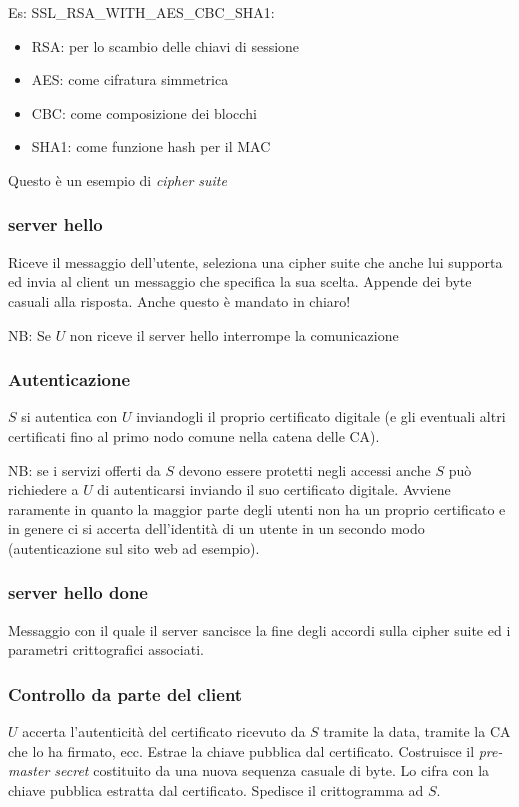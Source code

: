 Es: SSL\_RSA\_WITH\_AES\_CBC\_SHA1:
\begin{itemize}
    \item RSA: per lo scambio delle chiavi di sessione
    \item AES: come cifratura simmetrica
    \item CBC: come composizione dei blocchi
    \item SHA1: come funzione hash per il MAC
\end{itemize}
Questo è un esempio di \emph{cipher suite}

\subsubsection{server hello}
Riceve il messaggio dell'utente, seleziona una cipher suite che anche lui supporta ed invia al client un messaggio che specifica la sua scelta. Appende dei byte casuali alla risposta. Anche questo è mandato in chiaro!

NB: Se $U$ non riceve il server hello interrompe la comunicazione

\subsubsection{Autenticazione}
$S$ si autentica con $U$ inviandogli il proprio certificato digitale (e gli eventuali altri certificati fino al primo nodo comune nella catena delle CA).

NB: se i servizi offerti da $S$ devono essere protetti negli accessi anche $S$ può richiedere a $U$ di autenticarsi inviando il suo certificato digitale. Avviene raramente in quanto la maggior parte degli utenti non ha un proprio certificato e in genere ci si accerta dell'identità di un utente in un secondo modo (autenticazione sul sito web ad esempio).

\subsubsection{server hello done}
Messaggio con il quale il server sancisce la fine degli accordi sulla cipher suite ed i parametri crittografici associati.

\subsubsection{Controllo da parte del client}
$U$ accerta l'autenticità del certificato ricevuto da $S$ tramite la data, tramite la CA che lo ha firmato, ecc. Estrae la chiave pubblica dal certificato. Costruisce il \emph{pre-master secret} costituito da una nuova sequenza casuale di byte. Lo cifra con la chiave pubblica estratta dal certificato. Spedisce il crittogramma ad $S$.

